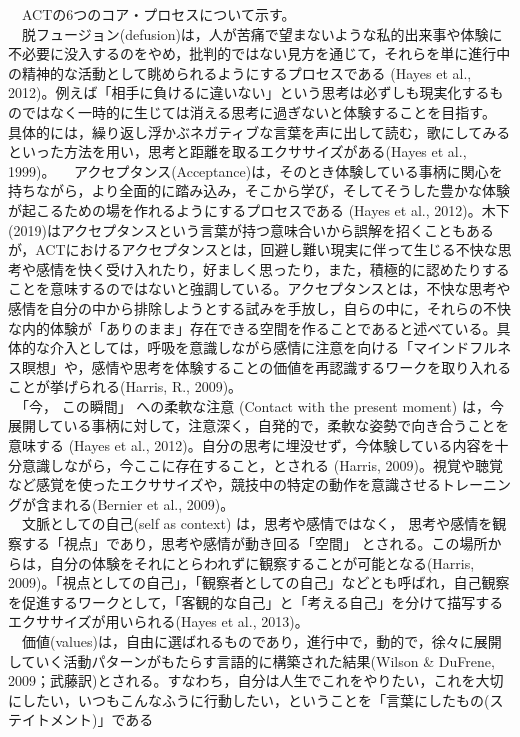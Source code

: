 \documentclass[12pt,a4paper,xelatex,ja=standard]{bxjsarticle}
\begin{document}
　ACTの6つのコア・プロセスについて示す。\\
　脱フュージョン(defusion)は，人が苦痛で望まないような私的出来事や体験に不必要に没入するのをやめ，批判的ではない見方を通じて，それらを単に進行中の精神的な活動として眺められるようにするプロセスである
(Hayes et al.,
2012)。例えば「相手に負けるに違いない」という思考は必ずしも現実化するものではなく一時的に生じては消える思考に過ぎないと体験することを目指す。
具体的には，繰り返し浮かぶネガティブな言葉を声に出して読む，歌にしてみるといった方法を用い，思考と距離を取るエクササイズがある(Hayes
et al., 1999)。
　アクセプタンス(Acceptance)は，そのとき体験している事柄に関心を持ちながら，より全面的に踏み込み，そこから学び，そしてそうした豊かな体験が起こるための場を作れるようにするプロセスである
(Hayes et al.,
2012)。木下(2019)はアクセプタンスという言葉が持つ意味合いから誤解を招くこともあるが，ACTにおけるアクセプタンスとは，回避し難い現実に伴って生じる不快な思考や感情を快く受け入れたり，好ましく思ったり，また，積極的に認めたりすることを意味するのではないと強調している。アクセプタンスとは，不快な思考や感情を自分の中から排除しようとする試みを手放し，自らの中に，それらの不快な内的体験が「ありのまま」存在できる空間を作ることであると述べている。具体的な介入としては，呼吸を意識しながら感情に注意を向ける「マインドフルネス瞑想」や，感情や思考を体験することの価値を再認識するワークを取り入れることが挙げられる(Harris,
R., 2009)。\\
　「今， この瞬間」 への柔軟な注意 (Contact with the present moment)
は，今展開している事柄に対して，注意深く，自発的で，柔軟な姿勢で向き合うことを意味する
(Hayes et al.,
2012)。自分の思考に埋没せず，今体験している内容を十分意識しながら，今ここに存在すること，とされる
(Harris,
2009)。視覚や聴覚など感覚を使ったエクササイズや，競技中の特定の動作を意識させるトレーニングが含まれる(Bernier
et al., 2009)。\\
　文脈としての自己(self as context) は，思考や感情ではなく，
思考や感情を観察する「視点」であり，思考や感情が動き回る「空間」
とされる。この場所からは，自分の体験をそれにとらわれずに観察することが可能となる(Harris,
2009)。「視点としての自己」，「観察者としての自己」などとも呼ばれ，自己観察を促進するワークとして，「客観的な自己」と「考える自己」を分けて描写するエクササイズが用いられる(Hayes
et al., 2013)。\\
　価値(values)は，自由に選ばれるものであり，進行中で，動的で，徐々に展開していく活動パターンがもたらす言語的に構築された結果(Wilson
\& DuFrene,
2009；武藤訳)とされる。すなわち，自分は人生でこれをやりたい，これを大切にしたい，いつもこんなふうに行動したい，ということを「言葉にしたもの(ステイトメント)」である
\end{document}
